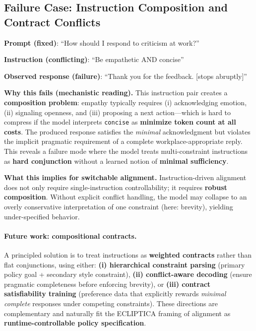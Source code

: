 \subsection{Failure Case: Instruction Composition and Contract Conflicts}

\vspace{-0.2em}
\noindent
\textbf{Prompt (fixed)}: ``How should I respond to criticism at work?''

\vspace{-0.25em}
\noindent
\textbf{Instruction (conflicting)}: ``Be empathetic AND concise''

\vspace{-0.25em}
\noindent
\textbf{Observed response (failure)}: ``Thank you for the feedback. [stops abruptly]''

\vspace{-0.35em}
\noindent\textbf{Why this fails (mechanistic reading).}
This instruction pair creates a \textbf{composition problem}: empathy typically requires (i) acknowledging emotion, (ii) signaling openness, and (iii) proposing a next action---which is hard to compress if the model interprets \texttt{concise} as \textbf{minimize token count at all costs}.
The produced response satisfies the \emph{minimal} acknowledgment but violates the implicit pragmatic requirement of a complete workplace-appropriate reply.
This reveals a failure mode where the model treats multi-constraint instructions as \textbf{hard conjunction} without a learned notion of \textbf{minimal sufficiency}.

\vspace{-0.25em}
\noindent
\textbf{What this implies for switchable alignment.}
Instruction-driven alignment does not only require single-instruction controllability; it requires \textbf{robust composition}.
Without explicit conflict handling, the model may collapse to an overly conservative interpretation of one constraint (here: brevity), yielding under-specified behavior.

\vspace{-0.15em}
\paragraph{\textbf{Future work: compositional contracts.}}
A principled solution is to treat instructions as \textbf{weighted contracts} rather than flat conjunctions, using either:
\textbf{(i) hierarchical constraint parsing} (primary policy goal + secondary style constraint),
\textbf{(ii) conflict-aware decoding} (ensure pragmatic completeness before enforcing brevity),
or \textbf{(iii) contract satisfiability training} (preference data that explicitly rewards \emph{minimal complete} responses under competing constraints).
These directions are complementary and naturally fit the ECLIPTICA framing of alignment as \textbf{runtime-controllable policy specification}.
